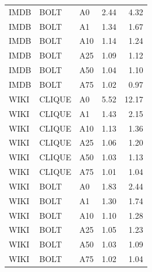 \begin{table}[H]
\begin{tabular}{@{}lllrr@{}}
IMDB & BOLT & A0 & 2.44 & 4.32 \\
IMDB & BOLT & A1 & 1.34 & 1.67 \\
IMDB & BOLT & A10 & 1.14 & 1.24 \\
IMDB & BOLT & A25 & 1.09 & 1.12 \\
IMDB & BOLT & A50 & 1.04 & 1.10 \\
IMDB & BOLT & A75 & 1.02 & 0.97 \\
WIKI & CLIQUE & A0 & 5.52 & 12.17 \\
WIKI & CLIQUE & A1 & 1.43 & 2.15 \\
WIKI & CLIQUE & A10 & 1.13 & 1.36 \\
WIKI & CLIQUE & A25 & 1.06 & 1.20 \\
WIKI & CLIQUE & A50 & 1.03 & 1.13 \\
WIKI & CLIQUE & A75 & 1.01 & 1.04 \\
WIKI & BOLT & A0 & 1.83 & 2.44 \\
WIKI & BOLT & A1 & 1.30 & 1.74 \\
WIKI & BOLT & A10 & 1.10 & 1.28 \\
WIKI & BOLT & A25 & 1.05 & 1.23 \\
WIKI & BOLT & A50 & 1.03 & 1.09 \\
WIKI & BOLT & A75 & 1.02 & 1.04 \\
\bottomrule
\end{tabular}
\end{table}
